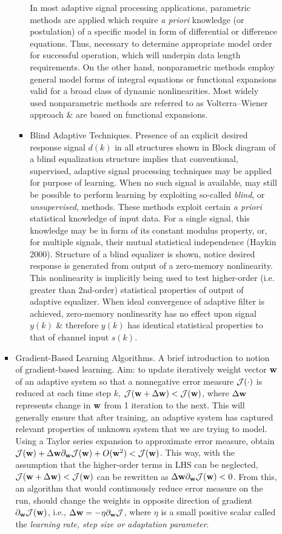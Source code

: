 \documentclass{article}
\begin{document}
\begin{enumerate}
\begin{itemize}
\begin{itemize}
\begin{itemize}
				In most adaptive signal processing applications, parametric methods are applied which require {\it a priori} knowledge (or postulation) of a specific model in form of differential or difference equations. Thus, necessary to determine appropriate model order for successful operation, which will underpin data length requirements. On the other hand, nonparametric methods employ general model forms of integral equations or functional expansions valid for a broad class of dynamic nonlinearities. Most widely used nonparametric methods are referred to as Volterra--Wiener approach \& are based on functional expansions.
				\item {\sf Blind Adaptive Techniques.} Presence of an explicit desired response signal $d(k)$ in all structures shown in {\sf Block diagram of a blind equalization structure} implies that conventional, supervised, adaptive signal processing techniques may be applied for purpose of learning. When no such signal is available, may still be possible to perform learning by exploiting so-called {\it blind}, or {\it unsupervised}, methods. These methods exploit certain {\it a priori} statistical knowledge of input data. For a single signal, this knowledge may be in form of its constant modulus property, or, for multiple signals, their mutual statistical independence (Haykin 2000). Structure of a blind equalizer is shown, notice desired response is generated from output of a zero-memory nonlinearity. This nonlinearity is implicitly being used to test higher-order (i.e. greater than 2nd-order) statistical properties of output of adaptive equalizer. When ideal convergence of adaptive filter is achieved, zero-memory nonlinearity has no effect upon signal $y(k)$ \& therefore $y(k)$ has identical statistical properties to that of channel input $s(k)$.
			\end{itemize}
			\item {\sf Gradient-Based Learning Algorithms.} A brief introduction to notion of gradient-based learning. Aim: to update iteratively weight vector ${\bf w}$ of an adaptive system so that a nonnegative error measure ${\cal J}(\cdot)$ is reduced at each time step $k$, ${\cal J}({\bf w} + \Delta{\bf w}) < {\cal J}({\bf w})$, where $\Delta{\bf w}$ represents change in ${\bf w}$ from 1 iteration to the next. This will generally ensure that after training, an adaptive system has captured relevant properties of unknown system that we are trying to model. Using a Taylor series expansion to approximate error measure, obtain ${\cal J}({\bf w}) + \Delta{\bf w}\partial_{\bf w}{\cal J}({\bf w}) + O({\bf w}^2) < {\cal J}({\bf w})$. This way, with the assumption that the higher-order terms in LHS can be neglected, ${\cal J}({\bf w} + \Delta{\bf w}) < {\cal J}({\bf w})$ can be rewritten as $\Delta{\bf w}\partial_{\bf w}{\cal J}({\bf w}) < 0$. From this, an algorithm that would continuously reduce error measure on the run, should change the weights in opposite direction of gradient $\partial_{\bf w}{\cal J}({\bf w})$, i.e., $\Delta{\bf w} = -\eta\partial_{\bf w}{\cal J}$, where $\eta$ is a small positive scalar called the {\it learning rate, step size or adaptation parameter}.
			

\end{itemize}
\end{itemize}
\end{enumerate}
\end{document}
